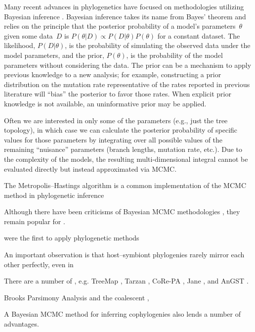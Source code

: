 \documentclass[12pt,letterpaper]{article}
\begin{document}
Many recent advances in phylogenetics have focused on methodologies utilizing Bayesian inference \parencites{Ronquist:2012}{Drummond:2012}. Bayesian inference takes its name from Bayes' theorem \parencite{Bayes:1763} and relies on the principle that the posterior probability of a model's parameters~$\theta$ given some data~$D$ is $P\left(\theta|D\right) \propto P\left(D|\theta\right) P\left(\theta\right)$ for a constant dataset. The likelihood, $P\left(D|\theta\right)$, is the probability of simulating the observed data under the model parameters, and the prior, $P\left(\theta\right)$, is the probability of the model parameters without considering the data. The prior can be a mechanism to apply previous knowledge to a new analysis; for example, constructing a prior distribution on the mutation rate representative of the rates reported in previous literature will \enquote{bias} the posterior to favor those rates. When explicit prior knowledge is not available, an uninformative prior may be applied.

Often we are interested in only some of the parameters (e.g., just the tree topology), in which case we can calculate the posterior probability of specific values for those parameters by integrating over all possible values of the remaining \enquote{nuisance} parameters (branch lengths, mutation rate, etc.). Due to the complexity of the models, the resulting multi-dimensional integral cannot be evaluated directly but instead approximated via \ac{MCMC}.

The Metropolis--Hastings algorithm \parencites{Metropolis:1953}{Hastings:1970} is a common implementation of the \ac{MCMC} method in phylogenetic inference

Although there have been criticisms of Bayesian \ac{MCMC} methodologies \parencites{Felsenstein:2005}{Kolaczkowski:2009}, they remain popular for \parencite{}.

\textcite{Haffner:1988} were the first to apply phylogenetic methods  

An important observation is that host--symbiont phylogenies rarely mirror each other perfectly, even in 

There are a number of , e.g. TreeMap \parencite{}, Tarzan \parencite{Merkle:2005}, CoRe-PA \parencite{Merkle:2010}, Jane \parencite{Conow:2010}, and AnGST \parencite{David:2011}.

Brooks Parsimony Analysis \parencite{Brooks:1981} and the coalescent \parencite{Rannala:2003} , 

A Bayesian \ac{MCMC} method for inferring cophylogenies also lends a number of advantages.
\end{document}
